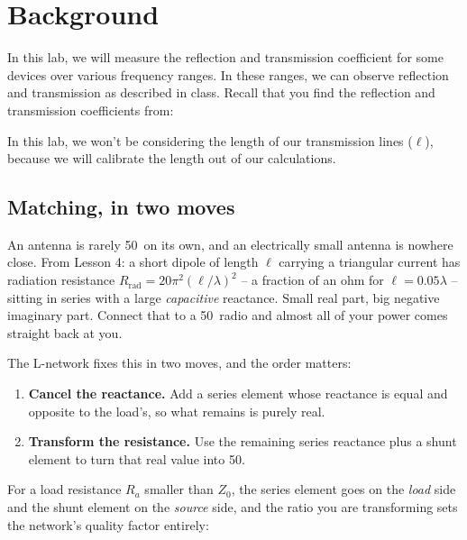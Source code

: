 \documentclass{exam}
\begin{document}
\section{Background}
\label{background}

In this lab, we will measure the reflection and transmission coefficient for some devices over various frequency ranges. In these ranges, we can observe reflection and transmission as described in class. Recall that you find the reflection and transmission coefficients from:
\vspace{-6pt}
\vspace{-12pt}

In this lab, we won't be considering the length of our transmission lines ($\ell$), because we will calibrate the length out of our calculations.

\subsection{Matching, in two moves}
\label{matchbackground}

An antenna is rarely 50\ohms\ on its own, and an electrically small antenna is
nowhere close. From Lesson 4: a short dipole of length $\ell$ carrying a
triangular current has radiation resistance
$R_{\text{rad}} = 20\pi^2(\ell/\lambda)^2$ -- a fraction of an ohm for
$\ell = 0.05\lambda$ -- sitting in series with a large \emph{capacitive}
reactance. Small real part, big negative imaginary part. Connect that to a
50\ohms\ radio and almost all of your power comes straight back at you.

The L-network fixes this in two moves, and the order matters:

\begin{enumerate}
	\item \textbf{Cancel the reactance.} Add a series element whose reactance is
	equal and opposite to the load's, so what remains is purely real.
	\item \textbf{Transform the resistance.} Use the remaining series reactance
	plus a shunt element to turn that real value into 50\ohms.
\end{enumerate}

For a load resistance $R_a$ smaller than $Z_0$, the series element goes on the
\emph{load} side and the shunt element on the \emph{source} side, and the
ratio you are transforming sets the network's quality factor entirely:
\end{document}
